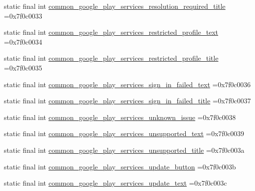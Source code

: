 \begin{DoxyCompactItemize}
\item 
static final int \mbox{\hyperlink{classbr_1_1unb_1_1cic_1_1mp_1_1marketmaster_1_1R_1_1string_a51e141aa13bbdc5d6e54eee9c21a77aa}{common\+\_\+google\+\_\+play\+\_\+services\+\_\+resolution\+\_\+required\+\_\+title}} =0x7f0c0033
\item 
static final int \mbox{\hyperlink{classbr_1_1unb_1_1cic_1_1mp_1_1marketmaster_1_1R_1_1string_a7520f551a2d0cc5c0dfdaac755647a7d}{common\+\_\+google\+\_\+play\+\_\+services\+\_\+restricted\+\_\+profile\+\_\+text}} =0x7f0c0034
\item 
static final int \mbox{\hyperlink{classbr_1_1unb_1_1cic_1_1mp_1_1marketmaster_1_1R_1_1string_af892eb716ec41da68741a781460b8308}{common\+\_\+google\+\_\+play\+\_\+services\+\_\+restricted\+\_\+profile\+\_\+title}} =0x7f0c0035
\item 
static final int \mbox{\hyperlink{classbr_1_1unb_1_1cic_1_1mp_1_1marketmaster_1_1R_1_1string_a928d329ba13048c245c1581e20431a5d}{common\+\_\+google\+\_\+play\+\_\+services\+\_\+sign\+\_\+in\+\_\+failed\+\_\+text}} =0x7f0c0036
\item 
static final int \mbox{\hyperlink{classbr_1_1unb_1_1cic_1_1mp_1_1marketmaster_1_1R_1_1string_a3f51c9f4ab9acf3a8035ccd2e72b40f3}{common\+\_\+google\+\_\+play\+\_\+services\+\_\+sign\+\_\+in\+\_\+failed\+\_\+title}} =0x7f0c0037
\item 
static final int \mbox{\hyperlink{classbr_1_1unb_1_1cic_1_1mp_1_1marketmaster_1_1R_1_1string_af6c4ed59ebb0aafbfa1aaa449632b4c4}{common\+\_\+google\+\_\+play\+\_\+services\+\_\+unknown\+\_\+issue}} =0x7f0c0038
\item 
static final int \mbox{\hyperlink{classbr_1_1unb_1_1cic_1_1mp_1_1marketmaster_1_1R_1_1string_a509d7ff858b447dbcd2770e703b8fb11}{common\+\_\+google\+\_\+play\+\_\+services\+\_\+unsupported\+\_\+text}} =0x7f0c0039
\item 
static final int \mbox{\hyperlink{classbr_1_1unb_1_1cic_1_1mp_1_1marketmaster_1_1R_1_1string_a38361b013472ffddbf7baa3b3b5e3ef6}{common\+\_\+google\+\_\+play\+\_\+services\+\_\+unsupported\+\_\+title}} =0x7f0c003a
\item 
static final int \mbox{\hyperlink{classbr_1_1unb_1_1cic_1_1mp_1_1marketmaster_1_1R_1_1string_a028ee7024b0f3f7a8817904fe884a4ab}{common\+\_\+google\+\_\+play\+\_\+services\+\_\+update\+\_\+button}} =0x7f0c003b
\item 
static final int \mbox{\hyperlink{classbr_1_1unb_1_1cic_1_1mp_1_1marketmaster_1_1R_1_1string_a0c4ce1549356b238154821cf71593534}{common\+\_\+google\+\_\+play\+\_\+services\+\_\+update\+\_\+text}} =0x7f0c003c

\end{DoxyCompactItemize}
